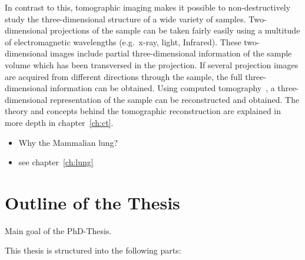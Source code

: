 In contrast to this, tomographic imaging makes it possible to non-destructively study the three-dimensional structure of a wide variety of samples. Two-dimensional projections of the sample can be taken fairly easily using a multitude of electromagnetic wavelengths (e.g.\ x-ray, light, Infrared). These two-dimensional images include partial three-dimensional information of the sample volume which has been transversed in the projection. If several projection images are acquired from different directions through the sample, the full three-dimensional information can be obtained. Using computed tomography~\cite{Hounsfield1976a}, a three-dimensional representation of the sample can be reconstructed and obtained. The theory and concepts behind the tomographic reconstruction are explained in more depth in chapter~\ref{ch:ct}.

\begin{itemize}
	\item Why the Mammalian lung?
	\item see chapter~\ref{ch:lung}
\end{itemize}

\section{Outline of the Thesis}
Main goal of the PhD-Thesis.

This thesis is structured into the following parts:

